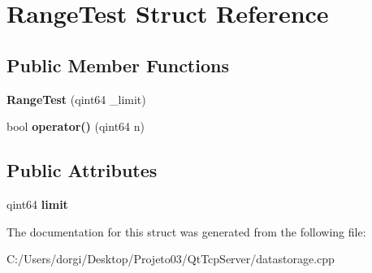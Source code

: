 \hypertarget{struct_range_test}{}\section{Range\+Test Struct Reference}
\label{struct_range_test}
\subsection*{Public Member Functions}
\begin{DoxyCompactItemize}
\item 
\mbox{\label{struct_range_test_a9d96f82c111ffd4d2747416b90306791}} 
{\bfseries Range\+Test} (qint64 \+\_\+limit)
\item 
\mbox{\label{struct_range_test_add496768a566e04219e840ee25e829d7}} 
bool {\bfseries operator()} (qint64 n)
\end{DoxyCompactItemize}
\subsection*{Public Attributes}
\begin{DoxyCompactItemize}
\item 
\mbox{\label{struct_range_test_a638ebd61c0447db219f10cd1473ab364}} 
qint64 {\bfseries limit}
\end{DoxyCompactItemize}


The documentation for this struct was generated from the following file\+:\begin{DoxyCompactItemize}
\item 
C\+:/\+Users/dorgi/\+Desktop/\+Projeto03/\+Qt\+Tcp\+Server/datastorage.\+cpp\end{DoxyCompactItemize}
